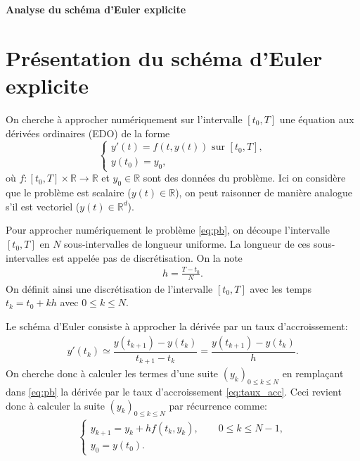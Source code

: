 \documentclass[12pt,a4paper,twoside]{article}
\begin{document}
\newtheorem{theorem}{Th\'eor\`eme}
\newtheorem{proposition}{Proposition}
\newtheorem{definition}{D\'efinition}
\newcommand*{\R}{\mathbb{R}}
\newcommand*{\N}{\mathbb{N}}

\begin{center}
{\bf \Huge Analyse du sch\'ema d'Euler explicite}
\end{center}


\section{Pr\'esentation du sch\'ema d'Euler explicite}

On cherche \`a approcher num\'eriquement sur l'intervalle $[t_0,T]$
une \'equation aux d\'eriv\'ees ordinaires (EDO)
de la forme
\begin{equation}
  \label{eq:pb}
  \left\{
    \begin{array}{l}
      y'(t) = f(t,y(t)) \text{ sur } [t_0,T] ,
      \\
      y(t_0) = y_0 ,
    \end{array}
  \right.
\end{equation}
o\`u $f : [t_0,T] \times \R \to \R$ et $y_0 \in \R$ sont des donn\'ees du probl\`eme.
Ici on consid\`ere que le probl\`eme est scalaire ($y(t) \in \R$),
on peut raisonner de mani\`ere analogue s'il est vectoriel ($y(t) \in \R^d$).


Pour approcher num\'eriquement le probl\`eme \eqref{eq:pb}, on d\'ecoupe l'intervalle
$[t_0,T]$ en $N$ sous-intervalles de longueur uniforme.
La longueur de ces sous-intervalles est appel\'ee pas de discr\'etisation.
On la note
\begin{align*}
  h = \frac{T - t_0}{N} .
\end{align*}
On d\'efinit ainsi une discr\'etisation 
de l'intervalle $[t_0,T]$ avec les temps $t_k = t_0 + kh$ avec $0 \leq k \leq N$.


Le sch\'ema d'Euler consiste \`a approcher la d\'eriv\'ee par un taux d'accroissement:
\begin{align}
  \label{eq:taux_acc}
  y'(t_k) \simeq \dfrac{y(t_{k+1}) - y(t_k)}{t_{k+1} - t_k } = \dfrac{y(t_{k+1}) - y(t_k)}{h} .
\end{align}
On cherche donc \`a calculer les termes d'une suite $(y_k)_{0 \leq k \leq N}$
en rempla\c{c}ant dans \eqref{eq:pb} la d\'eriv\'ee par le taux d'accroissement
\eqref{eq:taux_acc}.
Ceci revient donc \`a calculer la suite $(y_k)_{0 \leq k \leq N}$ par r\'ecurrence comme:
\begin{align*}
  \left\{
  \begin{array}{l}
    y_{k+1} = y_k + h f(t_k , y_k), \qquad 0 \leq k \leq N-1 ,
    \\
    y_0 = y(t_0) .
  \end{array}
  \right.
\end{align*}
\end{document}
